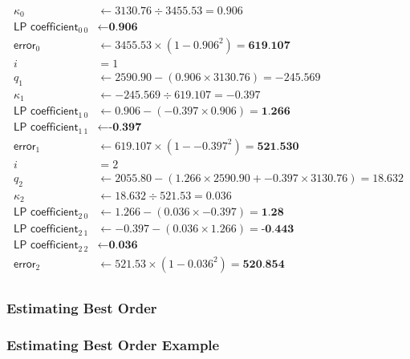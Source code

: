 {
  \begin{align*}
    \kappa_0 &\leftarrow 3130.76 \div 3455.53 = 0.906 \\
    \textsf{LP coefficient}_{0~0} &\leftarrow \textbf{0.906} \\
    \textsf{error}_0 &\leftarrow 3455.53 \times (1 - {0.906} ^ 2) = \textbf{619.107} \\
    i &= 1 \\
    q_1 &\leftarrow 2590.90 - (0.906 \times 3130.76) = -245.569 \\
    \kappa_1 &\leftarrow -245.569 \div 619.107 = -0.397 \\
    \textsf{LP coefficient}_{1~0} &\leftarrow 0.906 - (-0.397 \times 0.906) = \textbf{1.266} \\
    \textsf{LP coefficient}_{1~1} &\leftarrow \textbf{-0.397} \\
    \textsf{error}_1 &\leftarrow 619.107 \times (1 - {-0.397} ^ 2) = \textbf{521.530} \\
    i &= 2 \\
    q_2 &\leftarrow 2055.80 - (1.266 \times 2590.90 + -0.397 \times 3130.76) = 18.632 \\
    \kappa_2 &\leftarrow 18.632 \div 521.53 = 0.036 \\
    \textsf{LP coefficient}_{2~0} &\leftarrow 1.266 - (0.036 \times -0.397) = \textbf{1.28} \\
    \textsf{LP coefficient}_{2~1} &\leftarrow -0.397 - (0.036 \times 1.266) = \textbf{-0.443} \\
    \textsf{LP coefficient}_{2~2} &\leftarrow \textbf{0.036} \\
    \textsf{error}_2 &\leftarrow 521.53 \times (1 - {0.036} ^ 2) = \textbf{520.854} \\
  \end{align*}
}

\clearpage

\subsubsection{Estimating Best Order}
\label{flac:estimate_best_order}


\clearpage

\subsubsection{Estimating Best Order Example}

